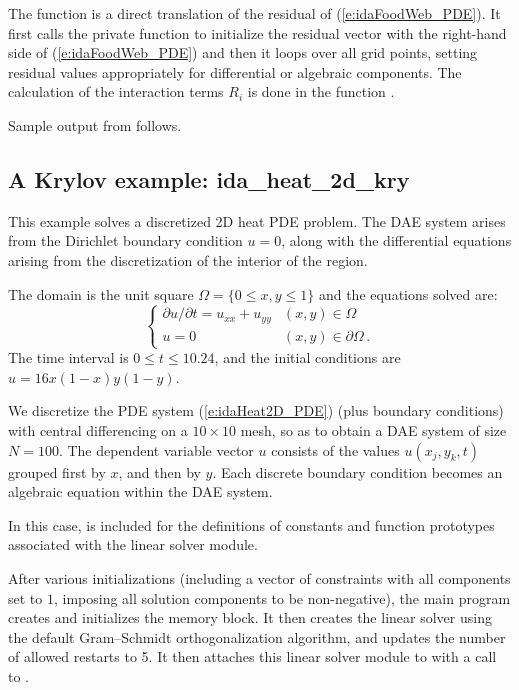 The function  is a direct translation of the residual of
(\ref{e:idaFoodWeb_PDE}).  It first calls the private function  to
initialize the residual vector with the right-hand side of (\ref{e:idaFoodWeb_PDE})
and then it loops over all grid points, setting residual values appropriately for 
differential or algebraic components. The calculation of the interaction terms
$R_i$ is done in the function .


Sample output from  follows.


\subsection{A Krylov example: ida\_heat\_2d\_kry}\label{ss:idaHeat2D}

This example solves a discretized 2D heat PDE problem. The DAE system
arises from the Dirichlet boundary condition $u = 0$, along with the 
differential equations arising from the discretization of the interior 
of the region. 

The domain is the unit square $\Omega = \{ 0 \le x,y \le 1 \}$ and the
equations solved are:
\begin{equation}\label{e:idaHeat2D_PDE}
\begin{cases}
  \partial u / \partial t = u_{xx} + u_{yy}  & (x,y) \in \Omega \\
  u = 0 & (x,y) \in \partial\Omega\, .
\end{cases}
\end{equation}
The time interval is $0 \leq t \leq 10.24$, and the initial conditions are 
$u = 16x(1-x)y(1-y)$.

We discretize the PDE system (\ref{e:idaHeat2D_PDE}) (plus boundary conditions)
with central differencing on a $10 \times 10$ mesh, so as to obtain a
DAE system of size $N = 100$.  The dependent variable vector $u$
consists of the values $u(x_j,y_k,t)$ grouped first by $x$, and then
by $y$.  Each discrete boundary condition becomes an algebraic equation
within the DAE system.

In this case,  is included for the definitions of
constants and function prototypes associated with the
{\sunlinsolspgmr} linear solver module.

After various initializations (including a vector of constraints with
all components set to $1$, imposing all solution components to be
non-negative), the main program creates and initializes the {\ida}
memory block.  It then creates the {\sunlinsolspgmr} linear solver
using the default  Gram--Schmidt orthogonalization
algorithm, and updates the number of allowed {\spgmr} restarts to 5.
It then attaches this linear solver module to {\ida} with a call to
.


